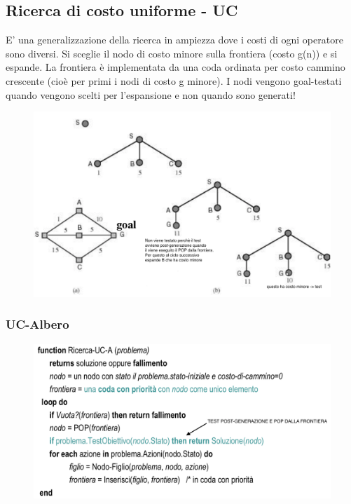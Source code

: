 \documentclass{article}
\begin{document}
\subsection{Ricerca di costo uniforme - UC}
E' una generalizzazione della ricerca in ampiezza dove i costi di ogni operatore sono diversi. Si sceglie il nodo di costo minore sulla frontiera (costo g(n)) e si espande. La frontiera è implementata da una coda ordinata per costo cammino crescente (cioè per primi i nodi di costo g minore). I nodi vengono goal-testati quando vengono scelti per l'espansione e non quando sono generati!
\begin{figure}[H]
    \centering
    \includegraphics[scale=0.8]{Images/UC.png}
\end{figure}

\subsubsection{UC-Albero}
\begin{figure}[H]
    \centering
    \includegraphics[scale=0.4]{Images/UC-A.png}
\end{figure}
\end{document}
